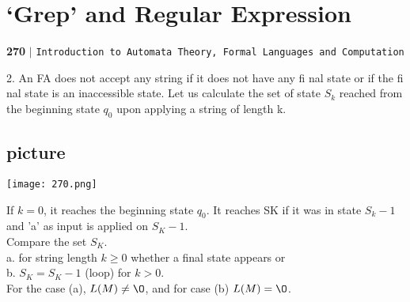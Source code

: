 \documentclass[8pt]{beamer}
\begin{document}
\begin{frame}
\section*{‘Grep’ and Regular Expression}
\begin{flushleft}
    \textbf{270}\hspace*{0.1cm} \textbf{$|$} \hspace*{0.1cm} \texttt{Introduction to Automata Theory, Formal Languages and Computation}
  \end{flushleft}

\vspace*{0.5cm}
\textcolor[rgb]{0.00,0.00,1.00}{2}. An FA does not accept any string if it does not have any fi nal state or if the fi nal state is an
inaccessible state. Let us calculate the set of state $S_k$ reached from the beginning state $q_0$ upon
applying a string of length k.\\

\begin{center}
\section{picture}
\texttt{[image: 270.png]}
\end{center}

\hspace*{0.3cm} If $k = 0$, it reaches the beginning state $q_0$. It reaches SK if it was in state $S_k-1$ and 'a' as input is
applied on $S_K-1$.\\
\hspace*{0.3cm} Compare the set $S_K$.\\

\vspace*{0.3cm}
\hspace*{0.5cm} a. for string length $k \geq 0$ whether a final state appears or\\
\hspace*{0.5cm} b. $S_K = S_K-1$ (loop) for $k > 0$.\\

\vspace*{0.3cm}
\hspace*{0.5cm} For the case (a), $L(M) \neq {\O}$, and for case (b) $L(M) = {\O}$.\\

\vspace*{0.3cm}
\end{frame}
\end{document}
